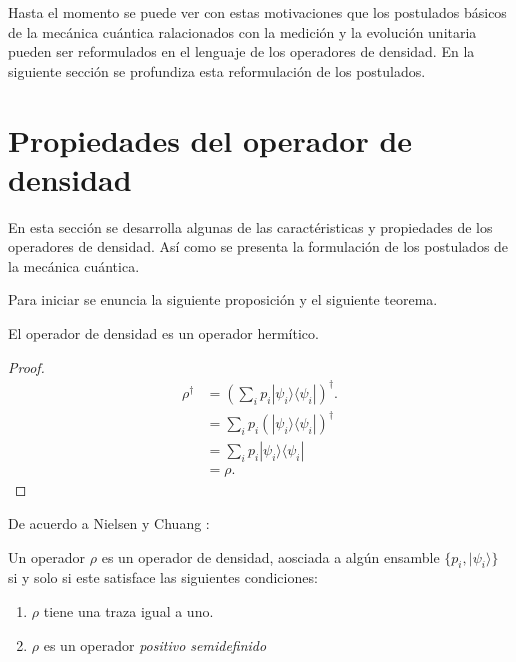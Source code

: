 Hasta el momento se puede ver con estas motivaciones que los postulados básicos de la mecánica cuántica ralacionados con la medición y la evolución unitaria pueden ser reformulados en el lenguaje de los operadores de densidad. En la siguiente sección se profundiza esta reformulación de los postulados.


\section{Propiedades del operador de densidad}\label{postulates}

En esta sección se desarrolla algunas de las caractéristicas y propiedades de los operadores de densidad. Así como se presenta la formulación de los postulados de la mecánica cuántica. 

Para iniciar se enuncia la siguiente proposición y el siguiente teorema. 

\begin{proposition}El operador de densidad es un operador hermítico.
	
\end{proposition}


\begin{proof}
	\begin{equation}
		\begin{split}
			\rho^\dagger&={\left(\sum_{i} p_i|\psi_i\rangle \langle \psi_i|\right)}^{\dagger}.\\
			&=\sum_{i} p_i {\left(|\psi_i\rangle \langle\psi_i|\right)}^{\dagger}\\
			&=\sum_{i} p_i |\psi_i\rangle \langle\psi_i|\\
			&=\rho.
		\end{split}
	\end{equation}
	
\end{proof}

De acuerdo a Nielsen y Chuang {\cite{nielsen_chuang_2010}}:

\begin{theorem} Un operador $\rho$ es un operador de densidad, aosciada a algún ensamble $\{p_i, |\psi_i\rangle\}$ si y solo si este satisface las siguientes condiciones:
\begin{enumerate}
	\item $\rho$ tiene una traza igual a uno.
	\item $\rho $ es un operador \textit{positivo semidefinido}
\end{enumerate}	
\end{theorem}


